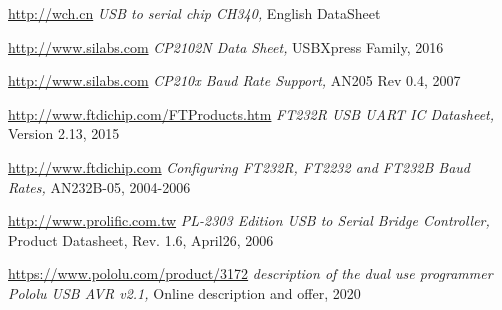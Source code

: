 \documentclass[pdftex,12pt,a4paper,oneside,english]{report}
\begin{document}
\begin{thebibliography}{99}
\url{http://wch.cn}
\emph{USB to serial chip CH340,}
English DataSheet

\url{http://www.silabs.com}
\emph{CP2102N Data Sheet,}
USBXpress Family,
2016

\url{http://www.silabs.com}
\emph{CP210x Baud Rate Support,}
AN205 Rev 0.4,
2007

\url{http://www.ftdichip.com/FTProducts.htm}
\emph{FT232R USB UART IC Datasheet,}
Version 2.13,
2015

\url{http://www.ftdichip.com}
\emph{Configuring FT232R, FT2232 and FT232B Baud Rates,}
AN232B-05,
2004-2006

\url{http://www.prolific.com.tw}
\emph{PL-2303 Edition USB to Serial Bridge Controller,}
Product Datasheet, Rev. 1.6,
April26, 2006

\url{https://www.pololu.com/product/3172}
\emph{description of the dual use programmer Pololu USB AVR v2.1,}
Online description and offer,
2020


\end{thebibliography}
\end{document}
